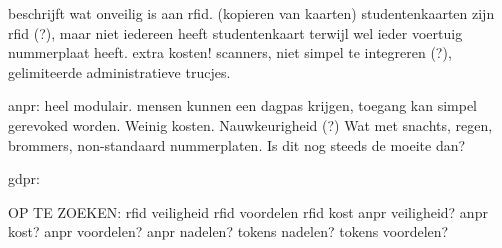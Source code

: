 \textcite{aalsalem2015automated} beschrijft wat onveilig is aan rfid. (kopieren van kaarten)
studentenkaarten zijn rfid (?), maar niet iedereen heeft studentenkaart terwijl wel ieder voertuig nummerplaat heeft.
extra kosten! scanners, niet simpel te integreren (?), gelimiteerde administratieve trucjes.

anpr:
	heel modulair. mensen kunnen een dagpas krijgen, toegang kan simpel gerevoked worden. Weinig kosten. Nauwkeurigheid (?)
	Wat met snachts, regen, brommers, non-standaard nummerplaten. Is dit nog steeds de moeite dan?

gdpr:



OP TE ZOEKEN:
rfid veiligheid
rfid voordelen
rfid kost
anpr veiligheid?
anpr kost?
anpr voordelen?
anpr nadelen?
tokens nadelen?
tokens voordelen?
	